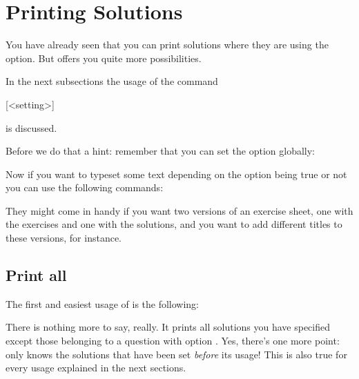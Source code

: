 \documentclass[DIV10,toc=index,toc=bib,numbers=noendperiod]{cnpkgdoc}
\newcommand*\unexpsign{$\RHD$}
\newcommand*\expsign{\textcolor{red}{$\rhd$}}
\renewcommand*\cnpkgdoctriangle{\unexpsign}
\newcommand*\expandable{%
  \def\cnpkgdoctriangle{%
    \expsign
    \gdef\cnpkgdoctriangle{\unexpsign}}}
\begin{document}
\section{Printing Solutions}\label{sec:solutions}
You have already seen that you can print solutions where they are using the
 option.  But \ExSheets offers you quite more
possibilities.

In the next subsections the usage of the command
\begin{beschreibung}
  [<setting>]
\end{beschreibung}
is discussed.

Before we do that a hint: remember that you can set the option 
globally:
\begin{beispiel}
\end{beispiel}

Now if you want to typeset some text depending on the option being true or not
you can use the following commands:
\begin{beschreibung}
  \expandable{}
  \expandable{}
  \expandable{}
\end{beschreibung}
They might come in handy if you want two versions of an exercise sheet, one
with the exercises and one with the solutions, and you want to add different
titles to these versions, for instance.

\subsection{Print all}
The first and easiest usage of  is the following:
\begin{beispiel}
 \printsolutions
\end{beispiel}
There is nothing more to say, really. It prints all solutions you have
specified except those belonging to a question with option .
Yes, there's one more point:  only knows the solutions
that have been set \emph{before} its usage!  This is also true for every usage
explained in the next sections.

\begin{beispiel}[below]
 \printsolutions
\end{beispiel}
\end{document}
